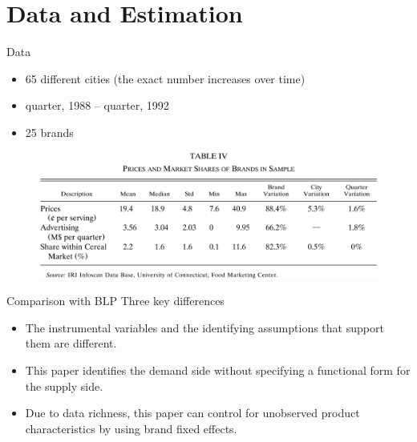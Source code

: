 \documentclass{beamer}
\begin{document}
\section{Data and Estimation}
\begin{frame}
	\transfade
	\tableofcontents[sectionstyle=show/shaded,subsectionstyle=show/shaded/hide]
	\addtocounter{framenumber}{-1}
\end{frame}
\begin{frame}{Data}
	\begin{itemize}
		\item 65 different cities (the exact number increases over time)
		\item {} quarter, 1988 –  quarter, 1992
		\item 25 brands
	\end{itemize}

	\begin{figure}[h]
		\centering
		\includegraphics[scale=0.2]{table4.png}
	\end{figure}
\end{frame}
\begin{frame}{Comparison with BLP}
	Three key differences
	\begin{itemize}
		\item The instrumental variables and the identifying assumptions that support them are different.
		\medskip

		\item This paper identifies the demand side without specifying a functional form for the supply side.
		\medskip
	
		\item Due to data richness, this paper can control for unobserved product characteristics by using brand fixed effects.
	\end{itemize}
\end{frame}
\end{document}
